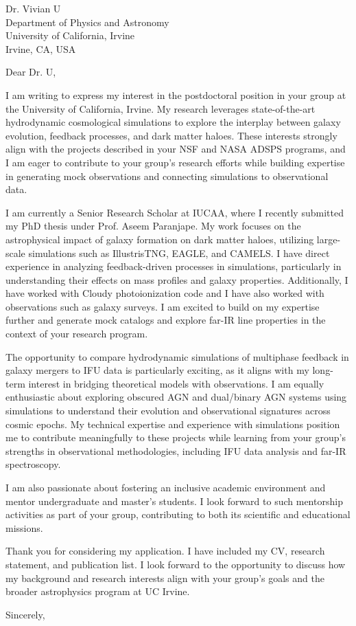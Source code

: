 \documentclass[11pt]{letter}
\begin{document}
\begin{letter}{Dr. Vivian U \\ Department of Physics and Astronomy \\ University of California, Irvine \\ Irvine, CA, USA}

\opening{Dear Dr. U,}

I am writing to express my interest in the postdoctoral position in your group at the University of California, Irvine. My research leverages state-of-the-art hydrodynamic cosmological simulations to explore the interplay between galaxy evolution, feedback processes, and dark matter haloes. These interests strongly align with the projects described in your NSF and NASA ADSPS programs, and I am eager to contribute to your group’s research efforts while building expertise in generating mock observations and connecting simulations to observational data. 

I am currently a Senior Research Scholar at IUCAA, where I recently submitted my PhD thesis under Prof. Aseem Paranjape. My work focuses on the astrophysical impact of galaxy formation on dark matter haloes, utilizing large-scale simulations such as IllustrisTNG, EAGLE, and CAMELS. I have direct experience in analyzing feedback-driven processes in simulations, particularly in understanding their effects on mass profiles and galaxy properties. Additionally, I have worked with Cloudy photoionization code and I have also worked with observations such as galaxy surveys. I am excited to build on my expertise further and generate mock catalogs and explore far-IR line properties in the context of your research program. 

The opportunity to compare hydrodynamic simulations of multiphase feedback in galaxy mergers to IFU data is particularly exciting, as it aligns with my long-term interest in bridging theoretical models with observations. I am equally enthusiastic about exploring obscured AGN and dual/binary AGN systems using simulations to understand their evolution and observational signatures across cosmic epochs. My technical expertise and experience with simulations position me to contribute meaningfully to these projects while learning from your group’s strengths in observational methodologies, including IFU data analysis and far-IR spectroscopy. 

I am also passionate about fostering an inclusive academic environment and mentor undergraduate and master's students. I look forward to such mentorship activities as part of your group, contributing to both its scientific and educational missions. 

Thank you for considering my application. I have included my CV, research statement, and publication list. I look forward to the opportunity to discuss how my background and research interests align with your group’s goals and the broader astrophysics program at UC Irvine.

\closing{Sincerely,}

\end{letter}
\end{document}
